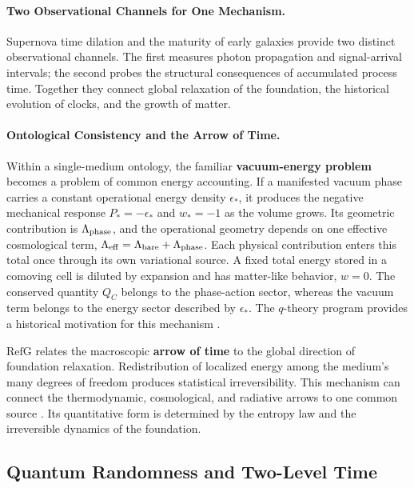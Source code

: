 \documentclass[11pt,a4paper]{article}
\newcommand{\RefG}{\mathrm{RefG}}
\begin{document}
\paragraph{Two Observational Channels for One Mechanism.}

Supernova time dilation and the maturity of early galaxies provide two distinct observational channels. The first measures photon propagation and signal-arrival intervals; the second probes the structural consequences of accumulated process time. Together they connect global relaxation of the foundation, the historical evolution of clocks, and the growth of matter.

\paragraph{Ontological Consistency and the Arrow of Time.}

Within a single-medium ontology, the familiar \textbf{vacuum-energy problem} becomes a problem of common energy accounting. If a manifested vacuum phase carries a constant operational energy density $\epsilon_*$, it produces the negative mechanical response $P_*=-\epsilon_*$ and $w_*=-1$ as the volume grows. Its geometric contribution is $\Lambda_{\rm phase}$, and the operational geometry depends on one effective cosmological term, $\Lambda_{\rm eff}=\Lambda_{\rm bare}+\Lambda_{\rm phase}$. Each physical contribution enters this total once through its own variational source. A fixed total energy stored in a comoving cell is diluted by expansion and has matter-like behavior, $w=0$. The conserved quantity $Q_C$ belongs to the phase-action sector, whereas the vacuum term belongs to the energy sector described by $\epsilon_*$. The $q$-theory program provides a historical motivation for this mechanism \citep{volovik2003,klinkhamer2008}.

$\RefG$ relates the macroscopic \textbf{arrow of time} to the global direction of foundation relaxation. Redistribution of localized energy among the medium's many degrees of freedom produces statistical irreversibility. This mechanism can connect the thermodynamic, cosmological, and radiative arrows to one common source \citep{planck1899}. Its quantitative form is determined by the entropy law and the irreversible dynamics of the foundation.
\subsection{Quantum Randomness and Two-Level Time}
\end{document}

